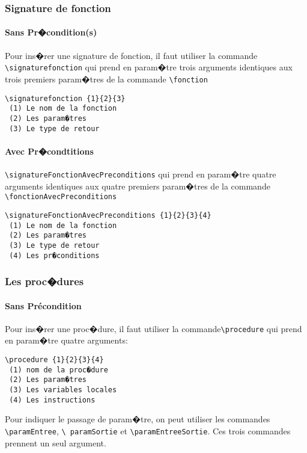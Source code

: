 \documentclass[a4paper,12pt]{report}
\begin{document}
\subsubsection{Signature de fonction}
\paragraph{Sans Pr�condition(s)}
Pour ins�rer une signature de fonction, il faut utiliser la commande
\texttt{\textbackslash signaturefonction} qui prend en param�tre trois
arguments identiques aux trois premiers param�tres de la commande \texttt{\textbackslash fonction}
\begin{lstlisting}
\signaturefonction {1}{2}{3}
 (1) Le nom de la fonction 
 (2) Les param�tres 
 (3) Le type de retour
 \end{lstlisting}

\paragraph{Avec Pr�condtitions}
\texttt{\textbackslash signatureFonctionAvecPreconditions} qui prend en param�tre quatre
arguments identiques aux quatre premiers param�tres de la commande \\
\texttt{\textbackslash fonctionAvecPreconditions}
\begin{lstlisting}
\signatureFonctionAvecPreconditions {1}{2}{3}{4}
 (1) Le nom de la fonction 
 (2) Les param�tres 
 (3) Le type de retour
 (4) Les pr�conditions
 \end{lstlisting}
 
 
\subsubsection{Les proc�dures}
\paragraph{Sans Précondition}
Pour ins�rer une proc�dure, il faut utiliser la commande\texttt{\textbackslash procedure} qui prend en param�tre quatre arguments:
\begin{lstlisting}
\procedure {1}{2}{3}{4} 
 (1) nom de la proc�dure
 (2) Les param�tres
 (3) Les variables locales
 (4) Les instructions
\end{lstlisting}

Pour indiquer le passage de param�tre, on peut utiliser les commandes
\texttt{\textbackslash paramEntree}, \texttt{\textbackslash
  paramSortie} et \texttt{\textbackslash paramEntreeSortie}. Ces trois
commandes prennent un seul argument.
\end{document}
